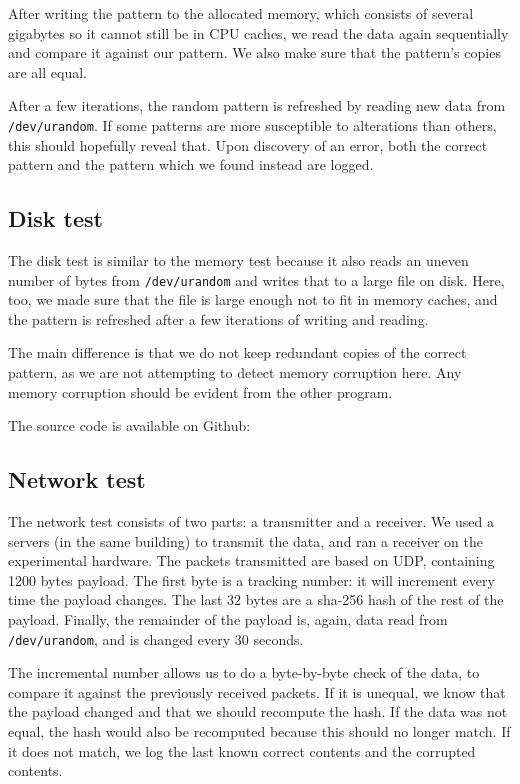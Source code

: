 \documentclass[conference]{IEEEtran}
\begin{document}
After writing the pattern to the allocated memory, which consists of several
gigabytes so it cannot still be in CPU caches, we read the data again
sequentially and compare it against our pattern. We also make sure that the
pattern's copies are all equal.

After a few iterations, the random pattern is refreshed by reading new data
from \texttt{/dev/urandom}. If some patterns are more susceptible to
alterations than others, this should hopefully reveal that. Upon discovery of
an error, both the correct pattern and the pattern which we found instead are
logged.

\subsection{Disk test}

The disk test is similar to the memory test because it also reads an uneven
number of bytes from \texttt{/dev/urandom} and writes that to a large file on
disk. Here, too, we made sure that the file is large enough not to fit in
memory caches, and the pattern is refreshed after a few iterations of writing
and reading.

The main difference is that we do not keep redundant copies of the correct
pattern, as we are not attempting to detect memory corruption here. Any memory
corruption should be evident from the other program.

The source code is available on Github: %

\subsection{Network test}

The network test consists of two parts: a transmitter and a receiver. We used a
servers (in the same building) to transmit the data, and ran a receiver on the
experimental hardware. The packets transmitted are based on UDP, containing
1200 bytes payload. The first byte is a tracking number: it will increment
every time the payload changes. The last 32 bytes are a sha-256 hash of the
rest of the payload. Finally, the remainder of the payload is, again, data read
from \texttt{/dev/urandom}, and is changed every 30 seconds.

The incremental number allows us to do a byte-by-byte check of the data, to
compare it against the previously received packets. If it is unequal, we know
that the payload changed and that we should recompute the hash. If the data was
not equal, the hash would also be recomputed because this should no longer
match. If it does not match, we log the last known correct contents and the
corrupted contents.
\end{document}
